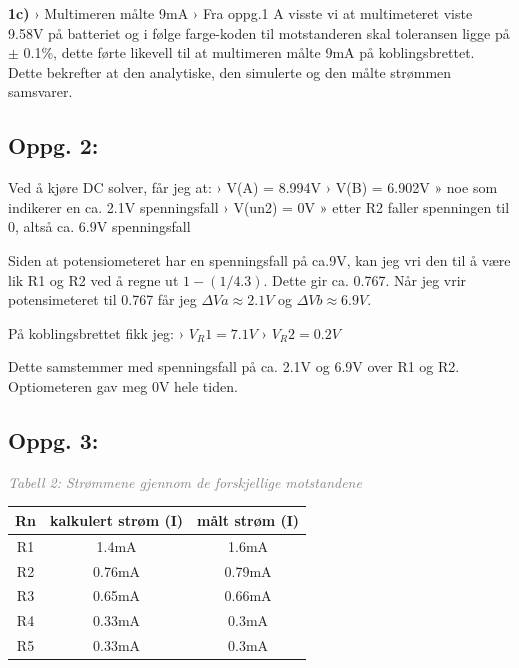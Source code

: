 \documentclass{article}
\begin{document}
        \textbf{1c)} \linebreak
            › Multimeren målte 9mA \linebreak
            › Fra oppg.1 A visste vi at multimeteret viste 9.58V på batteriet og i følge farge-koden til motstanderen 
            skal toleransen ligge på \(\pm\) 0.1\%, dette førte likevell til at multimeren målte 9mA på koblingsbrettet. 
            Dette bekrefter at den analytiske, den simulerte og den målte strømmen samsvarer.
        
        \subsection*{Oppg. 2:}
            Ved å kjøre DC solver, får jeg at: \linebreak
                › V(A) = 8.994V \linebreak
                › V(B) = 6.902V » noe som indikerer en ca. 2.1V spenningsfall \linebreak
                › V(un2) = 0V » etter R2 faller spenningen til 0, altså ca. 6.9V spenningsfall \linebreak

            Siden at potensiometeret har en spenningsfall på ca.9V, kan jeg vri den til å være lik R1 og R2 ved å regne 
            ut \(1-(1/4.3)\). Dette gir ca. 0.767. \linebreak
            Når jeg vrir potensimeteret til 0.767 får jeg \(\Delta Va \approx 2.1V \) og \(\Delta Vb \approx 6.9V \). \linebreak

            På koblingsbrettet fikk jeg:
            › \(V_R1 = 7.1V \)
            › \(V_R2 = 0.2V \)

            Dette samstemmer med spenningsfall på ca. 2.1V og 6.9V over R1 og R2. 
            Optiometeren gav meg 0V hele tiden.
        
        \subsection*{Oppg. 3:}
        \textit{\textcolor{gray}{Tabell 2: Strømmene gjennom de forskjellige motstandene}}\linebreak
        \begin{center}
            \begin{tabular}{c|c|c}
                Rn & kalkulert strøm (I) & målt strøm (I) \\
                \hline
                R1 & 1.4mA & 1.6mA\\
                R2 & 0.76mA & 0.79mA\\
                R3 & 0.65mA & 0.66mA\\
                R4 & 0.33mA & 0.3mA\\
                R5 & 0.33mA & 0.3mA\\
            \end{tabular}
        \end{center}
\end{document}
